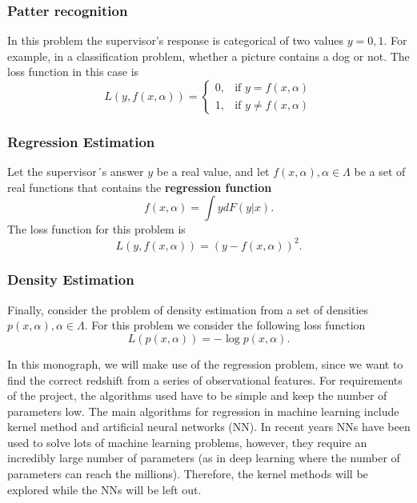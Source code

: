 \subsubsection*{Patter recognition}
In this problem the supervisor's response is categorical of two values $y = {0, 1}$. For example, in a classification problem, whether a picture contains a dog or not. The loss function in this case is 
\begin{equation}
L(y, f(x,\alpha)) = \begin{cases} 0, & \mbox{if } y= f(x, \alpha) \\ 1, & \mbox{if } y \ne f(x, \alpha) \end{cases}
\end{equation}
\subsubsection*{Regression Estimation}
Let the supervisor´s answer $y$ be a real value, and let $f(x, \alpha), \alpha \in \Lambda$ be a set of real functions that contains the \textbf{regression function} 
\begin{equation}
f(x, \alpha) = \int y dF(y|x).
\end{equation}
The loss function for this problem is
\begin{equation}
L(y, f(x,\alpha)) = (y - f(x, \alpha))^2 .
\end{equation}
\subsubsection*{Density Estimation}
Finally, consider the problem of density estimation from a set of densities $p(x, \alpha), \alpha \in \Lambda$. For this problem we consider the following loss function
\begin{equation}
L(p(x, \alpha)) = -\log p(x, \alpha).
\end{equation}

In this monograph, we will make use of the regression problem, since we want to find the correct redshift from a series of observational features. For requirements of the project, the algorithms used have to be simple and keep the number of parameters low. The main algorithms for regression in machine learning include kernel method and artificial neural networks (NN). In recent years NNs have been used to solve lots of machine learning problems, however, they require an incredibly large number of parameters (as in deep learning where the number of parameters can reach the millions). Therefore, the kernel methods will be explored while the NNs will be left out. 
